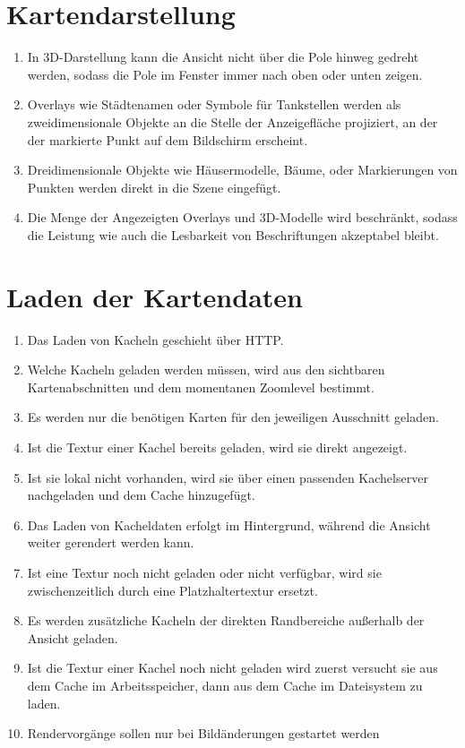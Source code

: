 \documentclass[10pt]{scrreprt}
\begin{document}
\section{Kartendarstellung}
\begin{enumerate}[leftmargin=2cm,resume]
\item In 3D-Darstellung kann die Ansicht nicht über die Pole hinweg gedreht werden, sodass die Pole im Fenster immer nach oben oder unten zeigen.
\item Overlays wie Städtenamen oder Symbole für Tankstellen werden als zweidimensionale Objekte an die Stelle der Anzeigefläche projiziert, an der der markierte Punkt auf dem Bildschirm erscheint.
\item \W Dreidimensionale Objekte wie Häusermodelle, Bäume, oder  Markierungen von Punkten werden direkt in die Szene eingefügt.
\item Die Menge der Angezeigten Overlays und 3D-Modelle wird beschränkt, sodass die Leistung wie auch die Lesbarkeit von Beschriftungen akzeptabel bleibt.
\end{enumerate}

\section{Laden der Kartendaten}
\begin{enumerate}[resume,leftmargin=2cm]
\item Das Laden von Kacheln geschieht über HTTP.
\item Welche Kacheln geladen werden müssen, wird  aus den sichtbaren Kartenabschnitten und dem momentanen Zoomlevel bestimmt.
\item Es werden nur die benötigen Karten für den jeweiligen Ausschnitt geladen.
\item Ist die Textur einer Kachel bereits geladen, wird sie direkt angezeigt.
\item Ist sie lokal nicht vorhanden, wird sie über einen passenden Kachelserver nachgeladen und dem Cache hinzugefügt.
\item Das Laden von Kacheldaten erfolgt im Hintergrund, während die Ansicht weiter gerendert werden kann.
\item \W Ist eine Textur noch nicht geladen oder nicht verfügbar, wird sie zwischenzeitlich durch eine Platzhaltertextur ersetzt.
\item \W Es werden zusätzliche Kacheln der direkten Randbereiche außerhalb der Ansicht geladen.
\item \W Ist die Textur einer Kachel noch nicht geladen wird zuerst versucht sie aus dem Cache im Arbeitsspeicher, dann aus dem Cache im Dateisystem zu laden.
\item \W Rendervorgänge sollen nur bei Bildänderungen gestartet werden
\end{enumerate}
\end{document}
